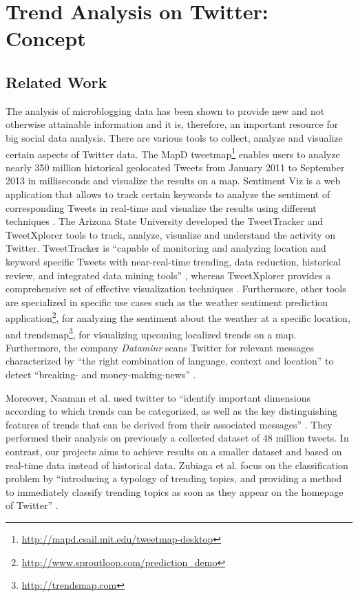 
\chapter{Trend Analysis on Twitter: Concept}
\label{cha:trend-detection-concept}

\section{Related Work}
\label{sec:related-work}
The analysis of microblogging data has been shown to provide new and not otherwise attainable information and it is, therefore, an important resource for big social data analysis. There are various tools to collect, analyze and visualize certain aspects of Twitter data. The MapD tweetmap\footnote{\url{http://mapd.csail.mit.edu/tweetmap-desktop} \accessednote} enables users to analyze nearly 350 million historical geolocated Tweets from January 2011 to September 2013 in milliseconds and visualize the results on a map. Sentiment Viz is a web application that allows to track certain keywords to analyze the sentiment of corresponding Tweets in real-time and visualize the results using different techniques \cite{healy2014twittersentiment}. The Arizona State University developed the TweetTracker and TweetXplorer tools to track, analyze, visualize and understand the activity on Twitter. TweetTracker is \enquote{capable of monitoring and analyzing location and keyword specific Tweets with near-real-time trending, data reduction, historical review, and integrated data mining tools} \cite[1]{kumar2011tweettracker}, whereas TweetXplorer provides a comprehensive set of effective visualization techniques \cite{morstatter2013understanding}. Furthermore, other tools are specialized in specific use cases such as the weather sentiment prediction application\footnote{\url{http://www.sproutloop.com/prediction_demo} \accessednote}, for analyzing the sentiment about the weather at a specific location, and trendsmap\footnote{\url{http://trendsmap.com} \accessednote}, for visualizing upcoming localized trends on a map. Furthermore, the company \textit{Dataminr} scans Twitter for relevant messages characterized by \enquote{the right combination of language, context and location} to detect \enquote{breaking- and money-making-news} \cite{alcorn2013stockmarket}.

Moreover, Naaman et al. used twitter to \enquote{identify important dimensions according to which trends can be categorized, as well as the key distinguishing features of trends that can be derived from their associated messages} \cite{naaman2011characterizing}. They performed their analysis on previously a collected dataset of 48 million tweets. In contrast, our projects aims to achieve results on a smaller dataset and based on real-time data instead of historical data. Zubiaga et al. focus on the classification problem by \enquote{introducing a typology of trending topics, and providing a method to immediately classify trending topics as soon as they appear on the homepage of Twitter} \cite{zubiaga2011classifications}.

